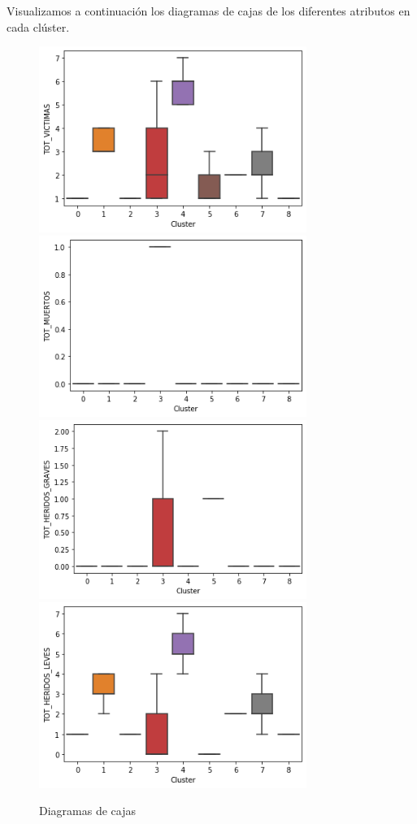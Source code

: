 \documentclass[a4]{article}
\begin{document}
\newpage
Visualizamos a continuación los diagramas de cajas de los diferentes atributos en cada clúster.

\begin{figure}[H]
  \centering
  \caption{Diagramas de cajas}
  \includegraphics[width=87mm]{imagenes/c2_kmeans_vic}
  \includegraphics[width=87mm]{imagenes/c2_kmeans_muertos}
    \includegraphics[width=87mm]{imagenes/c2_kmeans_hg}
  \includegraphics[width=87mm]{imagenes/c2_kmeans_hl}

\end{figure}
\end{document}
